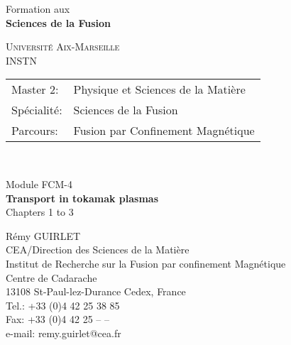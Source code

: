 \documentclass[chapterprefix,titlepage,appendixprefix,a4paper,12pt,openright]{scrbook}
\begin{document}
\setcounter{page}{0}

\thispagestyle{empty}

\noindent
\parbox[t]{65mm}{
\textsf{{\large Formation aux\\
\textbf{Sciences de la Fusion}}\\
}}
\parbox[t]{105mm}{
\vspace*{-\baselineskip}
\begin{flushright}
{\textsc{ Universit\'e Aix-Marseille}\\
INSTN}
\end{flushright}} \hbox{} \hfill

\vspace{2cm}

\Large
\begin{center}
\renewcommand{\arraystretch}{1.25}
\begin{tabular}{ll}
\hline
\textsf{Master 2}: & Physique et Sciences de la Mati\`ere\\
\textsf{Spécialit\'e}: & Sciences de la Fusion\\
\textsf{Parcours}: & Fusion par Confinement Magn\'etique\\
\hline
\end{tabular}\\
\end{center}

\vspace{.5cm} \large

\begin{center}
Module FCM-4 \smallskip\\
\textsf{\textbf{Transport in tokamak plasmas}}\smallskip\\
Chapters 1 to 3
\end{center}

\vspace{3cm} \normalsize

\begin{flushright}
\parbox{90mm}{Rémy GUIRLET\smallskip\\
CEA/Direction des Sciences de la Matière\\
Institut de Recherche sur la Fusion par confinement Magnétique\\
Centre de Cadarache\\
13108 St-Paul-lez-Durance Cedex, France \smallskip\\
Tel.: +33 (0)4 42 25 38 85\\ Fax: +33 (0)4 42 25 -- --\\
{\small e-mail: remy.guirlet@cea.fr}}
\end{flushright} \hbox{} \hfill
\end{document}
